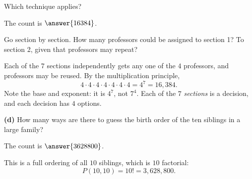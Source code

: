 \documentclass[12pt]{ximera}
\begin{document}
\begin{problem}
\begin{prompt}
Which technique applies?
\begin{multipleChoice}
\end{multipleChoice}

The count is $\answer{16384}$.

\begin{hint}
Go section by section. How many professors could be assigned to section 1? To
section 2, given that professors may repeat?
\end{hint}

\begin{feedback}
Each of the $7$ sections independently gets any one of the $4$ professors, and
professors may be reused. By the multiplication principle,
\[
4\cdot 4\cdot 4\cdot 4\cdot 4\cdot 4\cdot 4 = 4^7 = 16{,}384.
\]
Note the base and exponent: it is $4^7$, not $7^4$. Each of the $7$ \emph{sections}
is a decision, and each decision has $4$ options.
\end{feedback}
\end{prompt}

\begin{prompt}
\textbf{(d)} How many ways are there to guess the birth order of the ten siblings in
a large family?

The count is $\answer{3628800}$.

\begin{feedback}
This is a full ordering of all $10$ siblings, which is $10$ factorial:
\[
P(10,10)=10! = 3{,}628{,}800.
\]
\end{feedback}
\end{prompt}
\end{problem}
\end{document}

